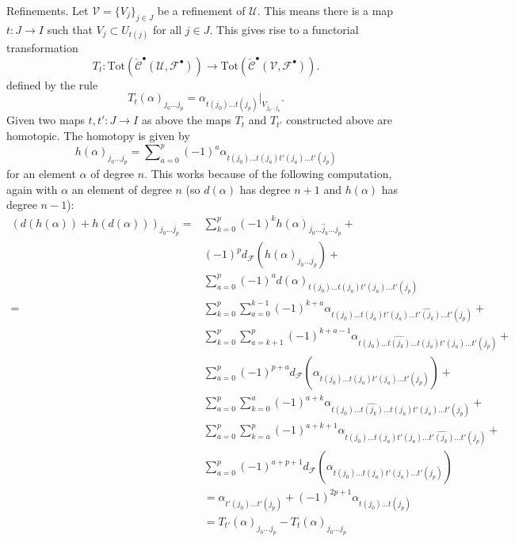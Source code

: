 \medskip\noindent
Refinements. Let ${\mathcal V} = \{ V_j \}_{j\in J}$ be a
refinement of ${\mathcal U}$. This means there is a map $t: J \to I$
such that $V_j \subset U_{t(j)}$ for all $j\in J$. This gives
rise to a functorial transformation
\begin{equation}
\label{equation-transformation}
T_t :
\text{Tot}(\check{\mathcal{C}}^\bullet({\mathcal U}, {\mathcal F}^\bullet))
\longrightarrow
\text{Tot}(\check{\mathcal{C}}^\bullet({\mathcal V}, {\mathcal F}^\bullet)).
\end{equation}
defined by the rule
$$
T_t(\alpha)_{j_0\ldots j_p}
=
\alpha_{t(j_0)\ldots t(j_p)}|_{V_{j_0\ldots j_p}}.
$$
Given two maps $t, t' : J \to I$ as above the maps
$T_t$ and $T_{t'}$ constructed above are homotopic.
The homotopy is given by
$$
h(\alpha)_{j_0\ldots j_p}
=
\sum\nolimits_{a = 0}^{p}
(-1)^a
\alpha_{t(j_0)\ldots t(j_a) t'(j_a) \ldots t'(j_p)}
$$
for an element $\alpha$ of degree $n$. This works
because of the following computation, again with
$\alpha$ an element of degree $n$ (so $d(\alpha)$
has degree $n + 1$ and $h(\alpha)$ has degree $n - 1$):
\begin{align*}
(
d(h(\alpha)) + h(d(\alpha))
)_{j_0\ldots j_p}
= &
\sum\nolimits_{k = 0}^p
(-1)^k
h(\alpha)_{j_0 \ldots \hat j_k \ldots j_p}
+ \\
&
(-1)^p
d_{\mathcal F}(h(\alpha)_{j_0 \ldots j_p})
+ \\
&
\sum\nolimits_{a = 0}^p
(-1)^a
d(\alpha)_{t(j_0) \ldots t(j_a) t'(j_a) \ldots t'(j_p)}
\\
= &
\sum\nolimits_{k = 0}^p
\sum\nolimits_{a = 0}^{k - 1}
(-1)^{k + a}
\alpha_{t(j_0)\ldots t(j_a)t'(j_a)\ldots \hat{t'(j_k)}\ldots t'(j_p)}
+ \\
&
\sum\nolimits_{k = 0}^p
\sum\nolimits_{a = k + 1}^p
(-1)^{k + a - 1}
\alpha_{t(j_0)\ldots \hat{t(j_k)}\ldots t(j_a)t'(j_a)\ldots t'(j_p)}
+ \\
&
\sum\nolimits_{a = 0}^p
(-1)^{p + a}
d_{\mathcal F}(\alpha_{t(j_0)\ldots t(j_a) t'(j_a) \ldots t'(j_p)})
+ \\
&
\sum\nolimits_{a = 0}^p
\sum\nolimits_{k = 0}^a
(-1)^{a + k}
\alpha_{t(j_0)\ldots\hat{t(j_k)}\ldots t(j_a)t'(j_a)\ldots t'(j_p)}
+ \\
&
\sum\nolimits_{a = 0}^p
\sum\nolimits_{k = a}^p
(-1)^{a + k + 1}
\alpha_{t(j_0) \ldots t(j_a) t'(j_a) \ldots \hat{t'(j_k)} \ldots t'(j_p)}
+ \\
&
\sum\nolimits_{a = 0}^p
(-1)^{a + p + 1}
d_{\mathcal F}(\alpha_{t(j_0)\ldots t(j_a) t'(j_a) \ldots t'(j_p)})
\\
& =
\alpha_{t'(j_0)\ldots t'(j_p)} +
(-1)^{2p + 1}\alpha_{t(j_0)\ldots t(j_p)}
\\
& =
T_{t'}(\alpha)_{j_0\ldots j_p} - T_t(\alpha)_{j_0\ldots j_p}
\end{align*}
